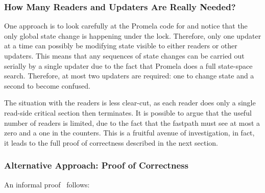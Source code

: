 \iffalse

The following sections discuss each of these approaches.

\fi

\subsubsection{How Many Readers and Updaters Are Really Needed?}
\label{sec:formal:How Many Readers and Updaters Are Really Needed?}

One approach is to look carefully at the Promela code for
 and notice that the only global state
change is happening under the lock.
Therefore, only one updater at a time can possibly be modifying
state visible to either readers or other updaters.
This means that any sequences of state changes can be carried
out serially by a single updater due to the fact that Promela does a full
state-space search.
Therefore, at most two updaters are required: one to change state
and a second to become confused.

The situation with the readers is less clear-cut, as each reader
does only a single read-side critical section then terminates.
It is possible to argue that the useful number of readers is limited,
due to the fact that the fastpath must see at most a zero and a one
in the counters.
This is a fruitful avenue of investigation, in fact, it leads to
the full proof of correctness described in the next section.

\subsubsection{Alternative Approach: Proof of Correctness}
\label{sec:formal:Alternative Approach: Proof of Correctness}

An informal proof~\cite{PaulMcKenney2007QRCUpatch}
follows:


